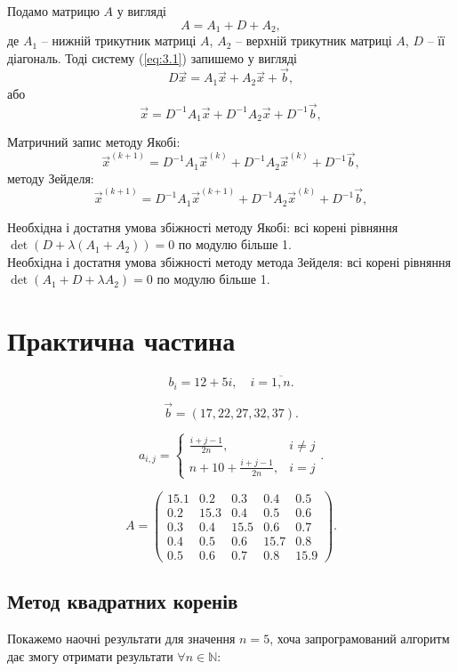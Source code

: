 \documentclass[12pt, a4paper]{article}
\theoremstyle{definition}
\newcommand{\NN}{\mathbb{N}}
\numberwithin{equation}{section}
\begin{document}
Подамо матрицю $A$ у вигляді \[ A = A_1 + D + A_2, \]
де $A_1$ -- нижній трикутник матриці $A$, $A_2$ -- верхній трикутник матриці $A$, $D$ -- її
діагональ. Тоді систему (\ref{eq:3.1}) запишемо у вигляді \[ D \vec x = A_1 \vec x + A_2 \vec x + \vec b,\]
або
\[ \vec x = D^{-1} A_1 \vec x + D^{-1} A_2 \vec x + D^{-1} \vec b,\]
 
Матричний запис методу Якобі:
\[ \vec x^{(k+1)} = D^{-1} A_1 \vec x^{(k)} + D^{-1} A_2 \vec x^{(k)} + D^{-1} \vec b,\]
методу Зейделя:
\[ \vec x^{(k+1)} = D^{-1} A_1 \vec x^{(k+1)} + D^{-1} A_2 \vec x^{(k)} + D^{-1} \vec b,\]

Необхідна і достатня умова збіжності методу Якобі: всі корені рівняння $\det(D + \lambda(A_1 + A_2 )) = 0$ по модулю більше 1. \\

Необхідна і достатня умова збіжності методу метода Зейделя: всі корені рівняння $\det(A_1 + D + \lambda A_2) = 0$ по модулю більше 1.

\section{Практична частина}

\[ b_i = 12 + 5 i, \quad i = \overline{1, n}. \]

\[ \vec b = (17, 22, 27, 32, 37). \]

\[ a_{i,j} = \begin{cases} \frac{i+j-1}{2n}, & i \ne j \\ n + 10 + \frac{i+j-1}{2n}, & i = j \end{cases}. \]

\[ A = \begin{pmatrix} 15.1 & 0.2 & 0.3 & 0.4 & 0.5 \\ 0.2 & 15.3 & 0.4 & 0.5 & 0.6 \\ 0.3 & 0.4 & 15.5 & 0.6 & 0.7 \\ 0.4 & 0.5 & 0.6 & 15.7 & 0.8 \\ 0.5 & 0.6 & 0.7 & 0.8 & 15.9 \end{pmatrix}. \]

\subsection{Метод квадратних коренів}

Покажемо наочні результати для значення $n = 5$, хоча запрограмований алгоритм дає змогу отримати результати $\forall n \in \NN$:
\end{document}
